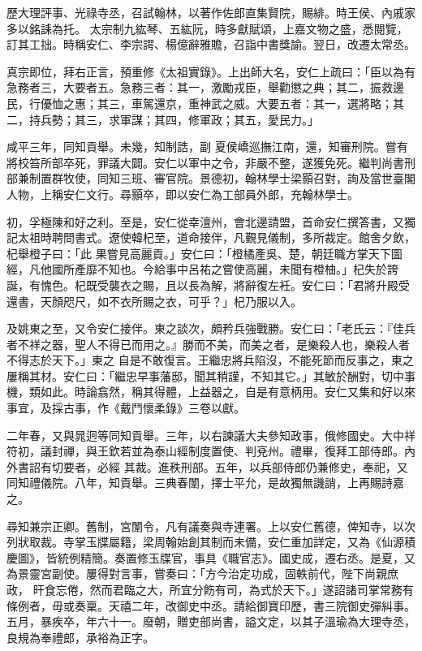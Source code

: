 \begin{pinyinscope}
 歷大理評事、光祿寺丞，召試翰林，以著作佐郎直集賢院，賜緋。時王侯、內戚家多以銘誄為托。
 太宗制九紘琴、五紘阮，時多獻賦頌，上嘉文物之盛，悉閱覽，訂其工拙。時稱安仁、李宗諤、楊億辭雅贍，召詣中書獎諭。翌日，改遷太常丞。



 真宗即位，拜右正言，預重修《太祖實錄》。上出師大名，安仁上疏曰：「臣以為有急務者三，大要者五。急務三者：其一，激勵戎臣，舉勸懲之典；其二，振救邊民，行優恤之惠；其三，車駕還京，重神武之威。大要五者：其一，選將略；其二，持兵勢；其三，求軍謀；其四，修軍政；其五，愛民力。」



 咸平三年，同知貢舉。未幾，知制誥，副
 夏侯嶠巡撫江南，還，知審刑院。嘗有將校笞所部卒死，罪議大闢。安仁以軍中之令，非嚴不整，遂獲免死。繼判尚書刑部兼制置群牧使，同知三班、審官院。景德初，翰林學士梁顥召對，詢及當世臺閣人物，上稱安仁文行。尋顥卒，即以安仁為工部員外郎，充翰林學士。



 初，孚極陳和好之利。至是，安仁從幸澶州，會北邊請盟，首命安仁撰答書，又獨記太祖時聘問書式。遼使韓杞至，道命接伴，凡覲見儀制，多所裁定。館舍夕飲，杞舉橙子曰：「此
 果嘗見高麗貢。」安仁曰：「橙橘產吳、楚，朝廷職方掌天下圖經，凡他國所產靡不知也。今給事中呂祐之嘗使高麗，未聞有橙柚。」杞失於誇誕，有愧色。杞既受襲衣之賜，且以長為解，將辭復左衽。安仁曰：「君將升殿受還書，天顏咫尺，如不衣所賜之衣，可乎？」杞乃服以入。



 及姚東之至，又令安仁接伴。東之談次，頗矜兵強戰勝。安仁曰：「老氏云：『佳兵者不祥之器，聖人不得已而用之。』勝而不美，而美之者，是樂殺人也，樂殺人者不得志於天下。」東之
 自是不敢復言。王繼忠將兵陷沒，不能死節而反事之，東之屢稱其材。安仁曰：「繼忠早事藩邸，聞其稍謹，不知其它。」其敏於酬對，切中事機，類如此。時論翕然，稱其得體，上益器之，自是有意柄用。安仁又集和好以來事宜，及採古事，作《戴鬥懷柔錄》三卷以獻。



 二年春，又與晁迥等同知貢舉。三年，以右諫議大夫參知政事，俄修國史。大中祥符初，議封禪，與王欽若並為泰山經制度置使、判兗州。禮畢，復拜工部侍郎。內外書詔有切要者，必經
 其裁。進秩刑部。五年，以兵部侍郎仍兼修史，奉祀，又同知禮儀院。八年，知貢舉。三典春闈，擇士平允，是故獨無譏誚，上再賜詩嘉之。



 尋知兼宗正卿。舊制，宮闈令，凡有議奏與寺連署。上以安仁舊德，俾知寺，以次列狀取裁。寺掌玉牒屬籍，梁周翰始創其制而未備，安仁重加詳定，又為《仙源積慶圖》，皆統例精簡。奏置修玉牒官，事具《職官志》。國史成，遷右丞。是夏，又為景靈宮副使。屢得對言事，嘗奏曰：「方今治定功成，固軼前代，陛下尚親庶政，
 旰食忘倦，然而君臨之大，所宜分飭有司，為式於天下。」遂詔諸司掌常務有條例者，毋或奏稟。天禧二年，改御史中丞。請給御寶印歷，書三院御史彈糾事。五月，暴疾卒，年六十一。廢朝，贈吏部尚書，謚文定，以其子溫瑜為大理寺丞，良規為奉禮郎，承裕為正字。




\end{pinyinscope}
